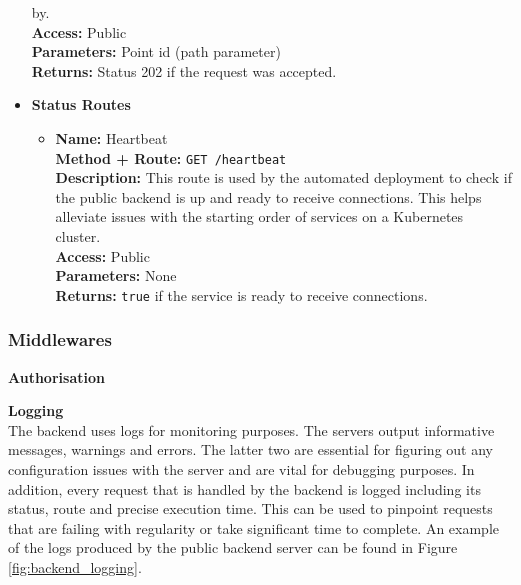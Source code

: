 \begin{itemize}
{\begin{itemize}
{        by.\\
        \textbf{Access:} Public\\
        \textbf{Parameters:} Point id (path parameter)\\
        \textbf{Returns:} Status 202 if the request was accepted.\\
      }
    \end{itemize}
  }
  \item{
    \textbf{Status Routes}
    \begin{itemize}
      \item {
        \textbf{Name:} Heartbeat\\
        \textbf{Method + Route:} \texttt{GET /heartbeat}\\
        \textbf{Description:} This route is used by the automated deployment to
        check if the public backend is up and ready to receive connections. This
        helps alleviate issues with the starting order of services on a
        Kubernetes cluster.\\
        \textbf{Access:} Public\\
        \textbf{Parameters:} None\\
        \textbf{Returns:} \texttt{true} if the service is ready to receive connections.\\
      }
    \end{itemize}
  }
\end{itemize}

\subsubsection{Middlewares}\label{backend_middlewares}
\label{middleware_route_authorisation}\textbf{Authorisation}\\


\label{middleware_logging}\textbf{Logging}\\
The backend uses logs for monitoring purposes. The servers output informative
messages, warnings and errors. The latter two are essential for figuring out any
configuration issues with the server and are vital for debugging purposes. In
addition, every request that is handled by the backend is logged including its
status, route and precise execution time. This can be used to pinpoint requests
that are failing with regularity or take significant time to complete. An
example of the logs produced by the public backend server can be found in Figure
\ref{fig:backend_logging}.

